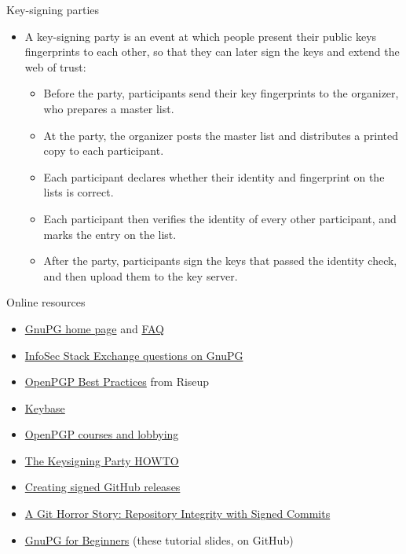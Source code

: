 \documentclass[
mode=present,
paper=smartboard,
size=20pt,
]{powerdot}
\begin{document}
\begin{slide}{Key-signing parties}
  \begin{itemize}
  \item A key-signing party is an event at which people present their
    public keys fingerprints to each other, so that they can later
    sign the keys and extend the web of trust:
    \begin{itemize}
    \item Before the party, participants send their key fingerprints
      to the organizer, who prepares a master list.
    \item At the party, the organizer posts the master list and
      distributes a printed copy to each participant.
    \item Each participant declares whether their identity and
      fingerprint on the lists is correct.
    \item Each participant then verifies the identity of every other
      participant, and marks the entry on the list.
    \item After the party, participants sign the keys that passed the
      identity check, and then upload them to the key server.
    \end{itemize}
  \end{itemize}
\end{slide}

\begin{slide}{Online resources}
  \begin{itemize}
  \item \href{https://gnupg.org/}{GnuPG home page} and \href{https://www.gnupg.org/faq/gnupg-faq.html}{FAQ}
  \item \href{http://security.stackexchange.com/questions/tagged/gnupg}{InfoSec Stack Exchange questions on GnuPG}
  \item \href{https://riseup.net/en/security/message-security/openpgp/best-practices}{OpenPGP Best Practices} from Riseup
  \item \href{https://keybase.io/}{Keybase}
  \item \href{http://www.openpgp-courses.org/}{OpenPGP courses and lobbying}
  \item \href{http://cryptnet.net/fdp/crypto/keysigning_party/en/keysigning_party.html}{The Keysigning Party HOWTO}
  \item
    \href{https://wiki.debian.org/Creating\%20signed\%20GitHub\%20releases}{Creating
      signed GitHub releases}
  \item \href{https://mikegerwitz.com/papers/git-horror-story}{A Git
      Horror Story: Repository Integrity with Signed Commits}
  \item \href{https://github.com/logological/GnuPGforBeginners}{GnuPG
      for Beginners} (these tutorial slides, on GitHub)
  \end{itemize}
\end{slide}
\end{document}

